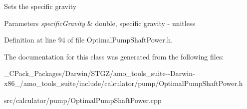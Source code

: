 Sets the specific gravity 
\begin{DoxyParams}{Parameters}
{\em specific\+Gravity} & double, specific gravity -\/ unitless \\
\hline
\end{DoxyParams}


Definition at line 94 of file Optimal\+Pump\+Shaft\+Power.\+h.



The documentation for this class was generated from the following files\+:\begin{DoxyCompactItemize}
\item 
\+\_\+\+C\+Pack\+\_\+\+Packages/\+Darwin/\+S\+T\+G\+Z/amo\+\_\+tools\+\_\+suite-\/-\/\+Darwin-\/x86\+\_/amo\+\_\+tools\+\_\+suite/include/calculator/pump/Optimal\+Pump\+Shaft\+Power.\+h\item 
src/calculator/pump/Optimal\+Pump\+Shaft\+Power.\+cpp\end{DoxyCompactItemize}

